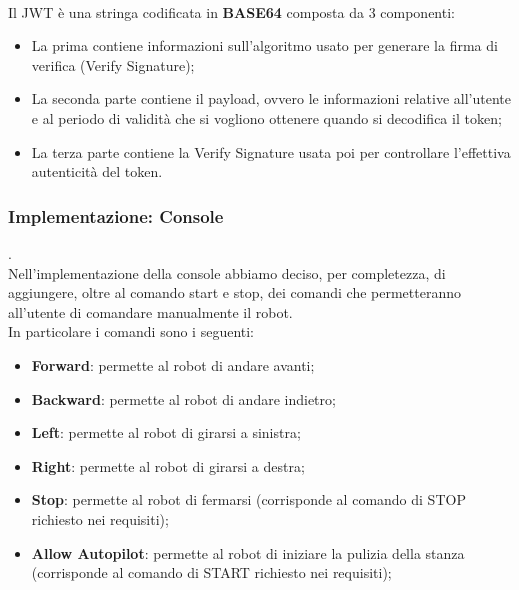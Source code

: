 \documentclass{llncs}
\begin{document}
\vspace*{1ex}
\\
Il JWT \`e una stringa codificata in \textbf{BASE64} composta da 3 componenti:
\begin{itemize}
    \item La prima contiene informazioni sull'algoritmo usato per generare la firma di verifica (Verify Signature);
    \item La seconda parte contiene il payload, ovvero le informazioni relative all'utente e al periodo di validit\`a che si vogliono ottenere quando si decodifica il token;
    \item La terza parte contiene la Verify Signature usata poi per controllare l'effettiva autenticit\`a del token.
\end{itemize}

\subsubsection{Implementazione: Console} .
\label{ImplementazioneReq1Console}
\vspace*{1ex}
\\
Nell'implementazione della console abbiamo deciso, per completezza, di aggiungere, oltre al comando start e stop, dei comandi che permetteranno all'utente di comandare manualmente il robot.\\
In particolare i comandi sono i seguenti:
\begin{itemize}
    \item \textbf{Forward}: permette al robot di andare avanti;
    \item \textbf{Backward}: permette al robot di andare indietro;
    \item \textbf{Left}: permette al robot di girarsi a sinistra;
    \item \textbf{Right}: permette al robot di girarsi a destra;
    \item \textbf{Stop}: permette al robot di fermarsi (corrisponde al comando di STOP richiesto nei requisiti);
    \item \textbf{Allow Autopilot}: permette al robot di iniziare la pulizia della stanza (corrisponde al comando di START richiesto nei requisiti);
\end{itemize}
\end{document}
